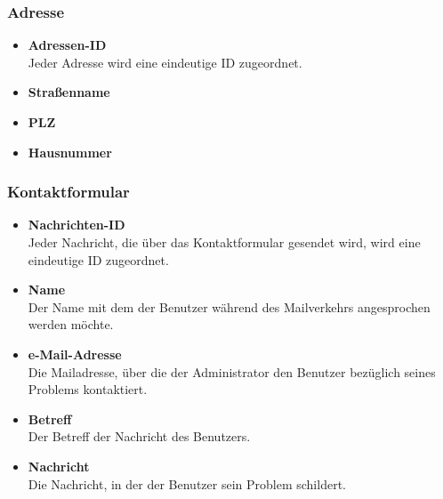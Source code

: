\subsubsection*{Adresse}
	\begin{itemize}
	    \item \textbf{Adressen-ID}\hfill\\
	    Jeder Adresse wird eine eindeutige ID zugeordnet.
		\item \textbf{Straßenname}\hfill\\
		\item \textbf{PLZ} \hfill\\		
		\item \textbf{Hausnummer}\hfill\\
	\end{itemize}
\subsubsection*{Kontaktformular}
	\begin{itemize}
	    \item \textbf{Nachrichten-ID}\hfill\\
	    Jeder Nachricht, die über das Kontaktformular gesendet wird, wird eine eindeutige ID zugeordnet.
		\item \textbf{Name} \hfill \\
		Der Name mit dem der Benutzer während des Mailverkehrs angesprochen werden möchte.
		\item \textbf{e-Mail-Adresse} \hfill \\
		Die Mailadresse, über die der Administrator den Benutzer bezüglich seines Problems kontaktiert. 
		\item \textbf{Betreff} \hfill \\
		Der Betreff der Nachricht des Benutzers.
		\item \textbf{Nachricht} \hfill \\
		Die Nachricht, in der der Benutzer sein Problem schildert.
	\end{itemize}	
	
